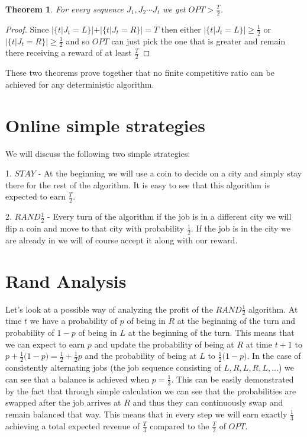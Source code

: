 \documentclass[]{article}
\newtheorem{theorem}{Theorem}
\newcommand{\rand}{ $ RAND \frac{1}{2} $ }
\begin{document}
\begin{theorem}
	
	For every sequence $ J_1,J_2 \cdots J_t $ we get $ OPT > \frac{T}{2} $.
	
\end{theorem}
\begin{proof}
	
	Since $ | \{ t | J_t = L \} | + | \{ t | J_t = R \} | = T $ then either $ | \{ t | J_t = L \} | \geq 
\frac{1}{2} $ or $ | \{ t | J_t = R \} | \geq 
\frac{1}{2} $ and so $ OPT $ can just pick the one that is greater and remain there receiving a reward of at least $ \frac{T}{2} $

\end{proof}

These two theorems prove together that no finite competitive ratio can be achieved for any deterministic algorithm.


\section{Online simple strategies}

We will discuss the following two simple strategies:

1. $ STAY $ - At the beginning we will use a coin to decide on a city and simply stay there for the rest of the algorithm. It is easy to see that this algorithm is expected to earn $ \frac{T}{2} $.

2. \rand - Every turn of the algorithm if the job is in a different city we will flip a coin and move to that city with probability $ \frac{1}{2} $. If the job is in the city we are already in we will of course accept it along with our reward.

\section{Rand Analysis}

Let's look at a possible way of analyzing the profit of the \rand algorithm. At time $ t $ we have a probability of $ p $ of being in $ R $ at the beginning of the turn and probability of $ 1 - p $ of being in $ L $ at the beginning of the turn. This means that we can expect to earn $ p $ and update the probability of being at $ R $ at time $ t + 1 $ to $ p + \frac{1}{2} \dot ( 1 - p ) = \frac{1}{2} + \frac{1}{2}p$ and the probability of being at $ L $ to $ \frac{1}{2} \dot ( 1 - p ) $. In the case of consistently alternating jobs (the job sequence consisting of $ L, R, L, R, L, \ldots $) we can see that a balance is achieved when $ p = \frac{1}{3} $. This can be easily demonstrated by the fact that through simple calculation we can see that the probabilities are swapped after the job arrives at $ R $ and thus they can continuously swap and remain balanced that way. This means that in every step we will earn exactly $ \frac{1}{3} $ achieving a total expected revenue of $ \frac{T}{3} $ compared to the $ \frac{T}{2} $ of $ OPT $.
\end{document}
